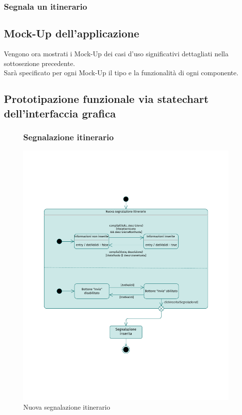 \documentclass{natourDoc}
\begin{document}
	
	\subsubsection{Segnala un itinerario}
	
	\newpage
	\subsection{Mock-Up dell'applicazione}
	Vengono ora mostrati i Mock-Up dei casi d'uso significativi dettagliati nella sottosezione precedente.\\
	Sarà specificato per ogni Mock-Up il tipo e la funzionalità di ogni componente.


	\newpage
	\subsection{Prototipazione funzionale via statechart dell'interfaccia grafica}

	\begin{figure}[!htbp]
		\subsubsection{Segnalazione itinerario}
		\centering
		\includegraphics[width=\textwidth, page=1]{./diagrams/statechart.pdf}
		\caption{Nuova segnalazione itinerario}
	\end{figure}
	\FloatBarrier
\end{document}
